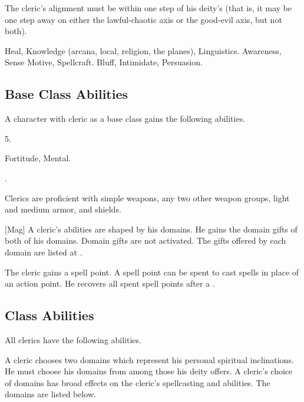     The cleric's alignment must be within one step of his deity's (that is, it may be one step away on either the lawful-chaotic axis or the good-evil axis, but not both).

     Heal, Knowledge (arcana, local, religion, the planes), Linguistics.
     Awareness, Sense Motive, Spellcraft.
     Bluff, Intimidate, Persuasion.

    \subsection{Base Class Abilities}
        A character with cleric as a base class gains the following abilities.

         5.

          Fortitude,  Mental.

         .

        Clerics are proficient with simple weapons, any two other weapon groups, light and medium armor, and shields.

        [Mag]
        A cleric's abilities are shaped by his domains.
        He gains the domain gifts of both of his domains.
        Domain gifts are not activated.
        The gifts offered by each domain are listed at .

        The cleric gains a spell point.
        A spell point can be spent to cast spells in place of an action point.
        He recovers all spent spell points after a .

    \subsection{Class Abilities}
        All clerics have the following abilities.

        A cleric chooses two domains which represent his personal spiritual inclinations.
        He must choose his domains from among those his deity offers.
        A cleric's choice of domains has broad effects on the cleric's spellcasting and abilities.
        The domains are listed below.


